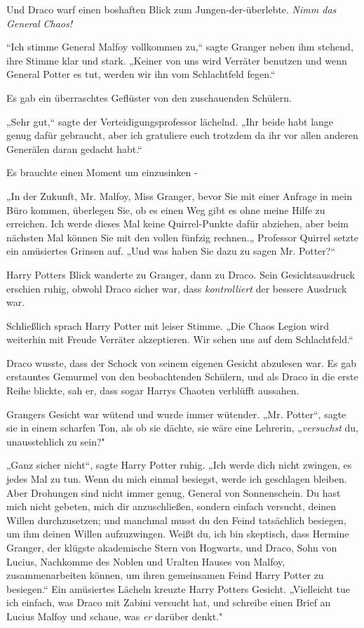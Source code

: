 {Und Draco warf einen boshaften Blick zum Jungen-der-überlebte. \emph{Nimm das General Chaos!}

“Ich stimme General Malfoy vollkommen zu,“ sagte Granger neben ihm stehend, ihre Stimme klar und stark. „Keiner von uns wird Verräter benutzen und wenn General Potter es tut, werden wir ihn vom Schlachtfeld fegen.“

Es gab ein überraschtes Geflüster von den zuschauenden Schülern.

„Sehr gut,“ sagte der Verteidigungsprofessor lächelnd. „Ihr beide habt lange genug dafür gebraucht, aber ich gratuliere euch trotzdem da ihr vor allen anderen Generälen daran gedacht habt.“

Es brauchte einen Moment um einzusinken -

„In der Zukunft, Mr. Malfoy, Miss Granger, bevor Sie mit einer Anfrage in mein Büro kommen, überlegen Sie, ob es einen Weg gibt es ohne meine Hilfe zu erreichen. Ich werde dieses Mal keine Quirrel-Punkte dafür abziehen, aber beim nächsten Mal können Sie mit den vollen fünfzig rechnen.„ Professor Quirrel setzte ein amüsiertes Grinsen auf. „Und was haben Sie dazu zu sagen Mr. Potter?“

Harry Potters Blick wanderte zu Granger, dann zu Draco. Sein Gesichtsausdruck erschien ruhig, obwohl Draco sicher war, dass \emph{kontrolliert} der bessere Ausdruck war.

Schließlich sprach Harry Potter mit leiser Stimme. „Die Chaos Legion wird weiterhin mit Freude Verräter akzeptieren. Wir sehen uns auf dem Schlachtfeld.“

Draco wusste, dass der Schock von seinem eigenen Gesicht abzulesen war. Es gab erstauntes Gemurmel von den beobachtenden Schülern, und als Draco in die erste Reihe blickte, sah er, dass sogar Harrys Chaoten verblüfft aussahen.

Grangers Gesicht war wütend und wurde immer wütender. „Mr. Potter“, sagte sie in einem scharfen Ton, als ob sie dächte, sie wäre eine Lehrerin, „\emph{versuchst} du, unausstehlich zu sein?"

„Ganz sicher nicht“, sagte Harry Potter ruhig. „Ich werde dich nicht zwingen, es jedes Mal zu tun. Wenn du mich einmal besiegst, werde ich geschlagen bleiben. Aber Drohungen sind nicht immer genug, General von Sonnenschein. Du hast mich nicht gebeten, mich dir anzuschließen, sondern einfach versucht, deinen Willen durchzusetzen; und manchmal musst du den Feind tatsächlich besiegen, um ihm deinen Willen aufzuzwingen. Weißt du, ich bin skeptisch, dass Hermine Granger, der klügste akademische Stern von Hogwarts, und Draco, Sohn von Lucius, Nachkomme des Noblen und Uralten Hauses von Malfoy, zusammenarbeiten können, um ihren gemeinsamen Feind Harry Potter zu besiegen.“ Ein amüsiertes Lächeln kreuzte Harry Potters Gesicht. „Vielleicht tue ich einfach, was Draco mit Zabini versucht hat, und schreibe einen Brief an Lucius Malfoy und schaue, was \emph{er} darüber denkt."

}
